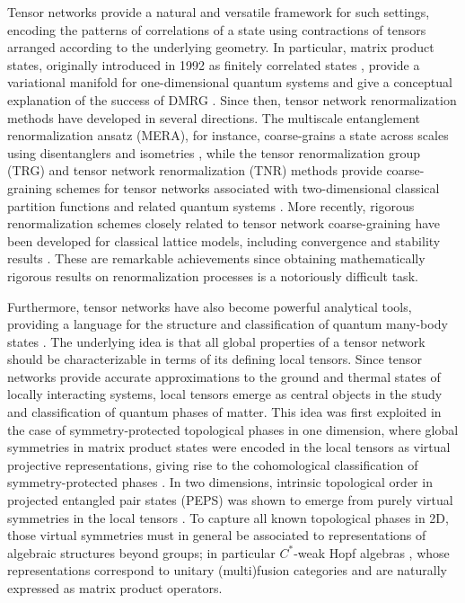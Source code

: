 \documentclass[a4paper,10pt]{amsart}
\theoremstyle{definition}
\begin{document}
Tensor networks provide a natural and versatile framework for such settings, encoding the patterns of correlations of a state using contractions of tensors arranged according to the underlying geometry.
In particular, matrix product states, originally introduced in 1992 as finitely correlated states \cite{fannes_finitely_1992}, provide a variational manifold for one-dimensional quantum systems and give a conceptual explanation of the success of DMRG \cite{ostlund_thermodynamic_1995,schollwock_density-matrix_2005,schollwock_density-matrix_2011}.
Since then, tensor network renormalization methods have developed in several directions.
The multiscale entanglement renormalization ansatz (MERA), for instance, coarse-grains a state across scales using disentanglers and isometries \cite{vidal_entanglement_2007,vidal_class_2008}, while the tensor renormalization group (TRG) and tensor network renormalization (TNR) methods provide coarse-graining schemes for tensor networks associated with two-dimensional classical partition functions and related quantum systems \cite{levin_tensor_2007,evenbly_tensor_2015,evenbly_tensor_2015-1}.
More recently, rigorous renormalization schemes closely related to tensor network coarse-graining have been developed for classical lattice models, including convergence and stability results \cite{kennedy_tensor_2022,kennedy_tensor_2024,ebel_tensor_2025,ebel_rotations_2025}. These are remarkable achievements since obtaining mathematically rigorous results on renormalization processes is a notoriously difficult task. 

Furthermore, tensor networks have also become powerful analytical tools, providing a language for the structure and classification of quantum many-body states \cite{cirac_matrix_2021}. The underlying idea is that all global properties of a tensor network should be characterizable in terms of its defining local tensors. Since tensor networks provide accurate approximations to the ground and thermal states of locally interacting systems, local tensors emerge as central objects in the study and classification of quantum phases of matter. 
This idea was first exploited in the case of symmetry-protected topological phases in one dimension, where global symmetries in matrix product states were encoded in the local tensors as virtual projective representations, giving rise to the cohomological classification of symmetry-protected phases \cite{chen_classification_2011,schuch_classifying_2011,pollmann_symmetry_2012}. In two dimensions, intrinsic topological order in projected entangled pair states (PEPS) was shown to emerge from purely virtual symmetries in the local tensors \cite{schuch_peps_2010,bultinck_anyons_2017,sahinoglu_characterizing_2021,cirac_matrix_2021,molnar_matrix_2022, ogata2025haag}. To capture all known topological phases in 2D, those virtual symmetries must in general be associated to representations of algebraic structures beyond groups; in particular $C^*$-weak Hopf algebras \cite{molnar_matrix_2022, ogata2025haag}, whose representations correspond to unitary (multi)fusion categories and are naturally expressed as matrix product operators.
\end{document}
